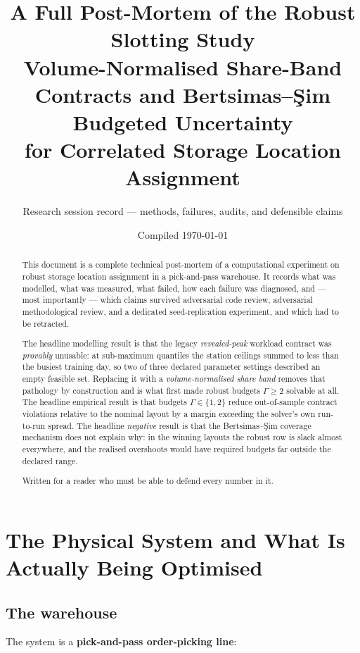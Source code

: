 \documentclass[11pt,a4paper]{article}
\title{\textbf{A Full Post-Mortem of the Robust Slotting Study}\\[4pt]
\large Volume-Normalised Share-Band Contracts and Bertsimas--\c{S}im
Budgeted Uncertainty\\ for Correlated Storage Location Assignment}
\author{Research session record --- methods, failures, audits, and defensible claims}
\date{Compiled \today}
\begin{document}
\maketitle

\begin{abstract}
\noindent
This document is a complete technical post-mortem of a computational
experiment on robust storage location assignment in a pick-and-pass
warehouse. It records what was modelled, what was measured, what failed,
how each failure was diagnosed, and --- most importantly --- which claims
survived adversarial code review, adversarial methodological review, and a
dedicated seed-replication experiment, and which had to be retracted.

The headline modelling result is that the legacy \emph{revealed-peak}
workload contract was \emph{provably} unusable: at sub-maximum quantiles the
station ceilings summed to less than the busiest training day, so two of
three declared parameter settings described an empty feasible set. Replacing
it with a \emph{volume-normalised share band} removes that pathology by
construction and is what first made robust budgets $\Gamma\ge 2$ solvable at
all. The headline empirical result is that budgets $\Gamma\in\{1,2\}$ reduce
out-of-sample contract violations relative to the nominal layout by a margin
exceeding the solver's own run-to-run spread. The headline \emph{negative}
result is that the Bertsimas--\c{S}im coverage mechanism does not explain
why: in the winning layouts the robust row is slack almost everywhere, and
the realised overshoots would have required budgets far outside the declared
range.

Written for a reader who must be able to defend every number in it.
\end{abstract}

\tableofcontents
\newpage

\section{The Physical System and What Is Actually Being Optimised}

\subsection{The warehouse}

The system is a \textbf{pick-and-pass order-picking line}:
\end{document}
